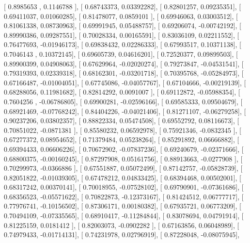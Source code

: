\documentclass{article}
\begin{document}
       [ 0.8985653 ,  0.1146788 ],
       [ 0.68743373,  0.03392282],
       [ 0.82801257,  0.09235351],
       [ 0.69411037,  0.01060285],
       [ 0.81478077,  0.0859101 ],
       [ 0.69946063,  0.03003512],
       [ 0.81061338,  0.08730963],
       [ 0.69991945,  0.05488757],
       [ 0.69206074, -0.00742192],
       [ 0.89990386,  0.09287551],
       [ 0.70028334,  0.00165591],
       [ 0.83036109,  0.02211552],
       [ 0.76477693, -0.01946173],
       [ 0.69838432,  0.02286333],
       [ 0.67993517,  0.10371138],
       [ 0.7046143 ,  0.10372145],
       [ 0.69605739,  0.04616201],
       [ 0.72520377,  0.09899503],
       [ 0.89900399,  0.04908063],
       [ 0.67629964, -0.02020274],
       [ 0.79273847, -0.04531541],
       [ 0.79319393,  0.02339318],
       [ 0.68162301, -0.03201718],
       [ 0.70395768, -0.05284973],
       [ 0.67166487, -0.01004051],
       [ 0.67745086, -0.04057767],
       [ 0.67104666, -0.00219139],
       [ 0.68288056,  0.11981682],
       [ 0.82814292,  0.0091007 ],
       [ 0.69112872, -0.05988354],
       [ 0.7604256 , -0.06786805],
       [ 0.69900281, -0.02596166],
       [ 0.69585333,  0.09504679],
       [ 0.68921469, -0.07768242],
       [ 0.84404226, -0.04021406],
       [ 0.81271107, -0.06279258],
       [ 0.90237206,  0.03802357],
       [ 0.88822334,  0.05474508],
       [ 0.69552792,  0.08116673],
       [ 0.70851022, -0.0871381 ],
       [ 0.85580232,  0.06592978],
       [ 0.75921346, -0.0832345 ],
       [ 0.67277372,  0.08954652],
       [ 0.71379484,  0.05238264],
       [ 0.85291892,  0.06666882],
       [ 0.69394433,  0.06606226],
       [ 0.70672902, -0.07837236],
       [ 0.69240679, -0.02371666],
       [ 0.68800375, -0.00160245],
       [ 0.87297908,  0.05161756],
       [ 0.88913663, -0.0277908 ],
       [ 0.70299973, -0.0366886 ],
       [ 0.67551887,  0.05072499],
       [ 0.87142757, -0.05828739],
       [ 0.82051822, -0.01039305],
       [ 0.67478212,  0.04833425],
       [ 0.68394468,  0.00502001],
       [ 0.68317242,  0.00370141],
       [ 0.70018955, -0.07528102],
       [ 0.69790901, -0.07361686],
       [ 0.68356523, -0.05571622],
       [ 0.70822873, -0.12373167],
       [ 0.81424512,  0.06777717],
       [ 0.77976741, -0.10156502],
       [ 0.87306171,  0.00180382],
       [ 0.67935721,  0.06773209],
       [ 0.70494109, -0.07335565],
       [ 0.68910417, -0.11284844],
       [ 0.83078694,  0.04791914],
       [ 0.81225159,  0.0181412 ],
       [ 0.82003073, -0.0902282 ],
       [ 0.67163856,  0.06048989],
       [ 0.74979433, -0.01714131],
       [ 0.74231978,  0.02796919],
       [ 0.87228048, -0.08075945],
\end{document}
